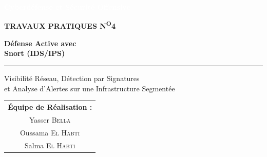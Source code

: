 \documentclass[12pt,a4paper,openany]{report}
\begin{document}
	\sloppy
	
	\begin{titlepage}
		\thispagestyle{empty}
		
		\noindent
		\colorbox{primary}{%
			\parbox{\dimexpr\textwidth-2\fboxsep}{%
				\vspace{0.6cm}
				\centering
				{\large\bfseries\textcolor{white}{Cyberdéfense et Sécurité Offensive}}\\[0.6cm]
			}%
		}
		
		\vspace{1.5cm}
		\centering
		
		{\normalsize\bfseries\color{black!40}\MakeUppercase{Travaux Pratiques N\textsuperscript{o}4}}
		
		\vspace{0.8cm}
		
		{\Huge\bfseries\color{primary}
			Défense Active avec\\[0.25cm]
			Snort (IDS/IPS)\par
		}
		
		\vspace{0.5cm}
		
		{\color{accent}\rule{7cm}{1.5pt}\par}
		
		\vspace{0.5cm}
		
		{\large\color{black!60}
			Visibilité Réseau, Détection par Signatures\\[0.2cm]
			et Analyse d'Alertes sur une Infrastructure Segmentée\par
		}
		
		\vspace{2cm}
		
		{\large
			\renewcommand{\arraystretch}{1.5}
			\begin{tabular}{c}
				\textbf{\color{primary}Équipe de Réalisation :}\\[0.3cm]
				Yasser \textsc{Bella} \\
				Oussama \textsc{El Habti} \\
				Salma \textsc{El Habti} \\[0.6cm]
				

\end{tabular}}
\end{titlepage}
\end{document}
